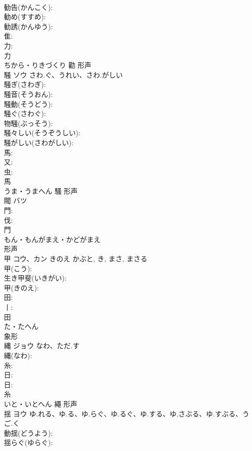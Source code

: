\documentclass[8pt]{extreport}
\begin{document}
\begin{CJK}{UTF8}{min}
\\	勧告(かんこく): 
\\	勧め(すすめ): 
\\	勧誘(かんゆう): 
\\	隹: 
\\	力: 
\\	力	
\\	ちから・りきづくり	勸	形声 
\\	騒	ソウ	さわ.ぐ、うれい、さわ.がしい		
\\	騒ぎ(さわぎ): 
\\	騒音(そうおん): 
\\	騒動(そうどう): 
\\	騒ぐ(さわぐ): 
\\	物騒(ぶっそう): 
\\	騒々しい(そうぞうしい): 
\\	騒がしい(さわがしい): 
\\	馬: 
\\	又: 
\\	虫: 
\\	馬	
\\	うま・うまへん	騷	形声 
\\	閥	バツ			
\\	門: 
\\	伐: 
\\	門	
\\	もん・もんがまえ・かどがまえ	
\\	形声 
\\	甲	コウ、カン	きのえ	かぶと, き, まさ, まさる	
\\	甲(こう): 
\\	生き甲斐(いきがい): 
\\	甲(きのえ): 
\\	田: 
\\	丨: 
\\	田	
\\	た・たへん	
\\	象形 
\\	縄	ジョウ	なわ、ただ.す		
\\	縄(なわ): 
\\	糸: 
\\	日: 
\\	日: 
\\	糸	
\\	いと・いとへん	繩	形声 
\\	揺	ヨウ	ゆ.れる、ゆ.る、ゆ.らぐ、ゆ.るぐ、ゆ.する、ゆ.さぶる、ゆ.すぶる、うご.く		
\\	動揺(どうよう): 
\\	揺らぐ(ゆらぐ): 

\end{CJK}
\end{document}
